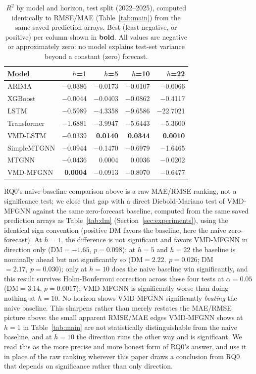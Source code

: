 \documentclass[journal]{IEEEtran}
\begin{document}
\begin{table}[t]
\centering
\caption{$R^2$ by model and horizon, test split (2022--2025), computed identically to RMSE/MAE (Table~\ref{tab:main}) from the same saved prediction arrays. Best (least negative, or positive) per column shown in \textbf{bold}. All values are negative or approximately zero: no model explains test-set variance beyond a constant (zero) forecast.}
\label{tab:r2}
\begin{tabular}{lrrrr}
\toprule
Model & $h$=1 & $h$=5 & $h$=10 & $h$=22 \\
\midrule
ARIMA & $-$0.0386 & $-$0.0173 & $-$0.0107 & $-$0.0066 \\
XGBoost & $-$0.0044 & $-$0.0403 & $-$0.0862 & $-$0.4117 \\
LSTM & $-$0.5989 & $-$4.3358 & $-$9.6586 & $-$22.7021 \\
Transformer & $-$1.6881 & $-$3.9947 & $-$5.6443 & $-$5.3600 \\
VMD-LSTM & $-$0.0339 & \textbf{0.0140} & \textbf{0.0344} & \textbf{0.0010} \\
SimpleMTGNN & $-$0.0944 & $-$0.1470 & $-$0.6979 & $-$1.6465 \\
MTGNN & $-$0.0436 & 0.0004 & 0.0036 & $-$0.0202 \\
VMD-MFGNN & \textbf{0.0004} & $-$0.0913 & $-$0.8070 & $-$0.6477 \\
\bottomrule
\end{tabular}
\end{table}

RQ0's naive-baseline comparison above is a raw MAE/RMSE ranking, not a significance test; we close that gap with a direct Diebold-Mariano test of VMD-MFGNN against the same zero-forecast baseline, computed from the same saved prediction arrays as Table~\ref{tab:dm} (Section~\ref{sec:experiments}), using the identical sign convention (positive DM favors the baseline, here the naive zero-forecast). At $h=1$, the difference is not significant and favors VMD-MFGNN in direction only (DM$=-1.65$, $p=0.098$); at $h=5$ and $h=22$ the baseline is nominally ahead but not significantly so (DM$=2.22,\ p=0.026$; DM$=2.17,\ p=0.030$); only at $h=10$ does the naive baseline win significantly, and this result survives Holm-Bonferroni correction across these four tests at $\alpha=0.05$ (DM$=3.14$, $p=0.0017$): VMD-MFGNN is significantly worse than doing nothing at $h=10$. No horizon shows VMD-MFGNN significantly \emph{beating} the naive baseline. This sharpens rather than merely restates the MAE/RMSE picture above: the small apparent RMSE/MAE edges VMD-MFGNN shows at $h=1$ in Table~\ref{tab:main} are not statistically distinguishable from the naive baseline, and at $h=10$ the direction runs the other way and is significant. We read this as the more precise and more honest form of RQ0's answer, and use it in place of the raw ranking wherever this paper draws a conclusion from RQ0 that depends on significance rather than only direction.
\end{document}
